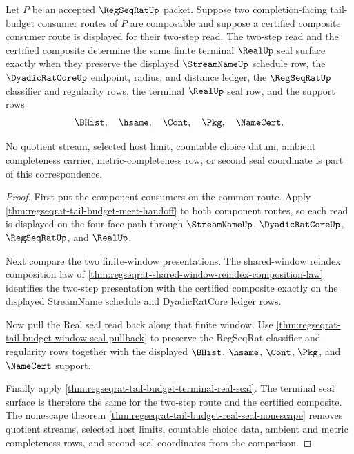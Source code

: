 \begin{theorem}
\label{thm:regseqrat-tail-budget-composition-correspondence}
Let $P$ be an accepted $\RegSeqRatUp$ packet. Suppose two completion-facing
tail-budget consumer routes of $P$ are composable and suppose a certified
composite consumer route is displayed for their two-step read. The two-step
read and the certified composite determine the same finite terminal $\RealUp$
seal surface exactly when they preserve the displayed $\StreamNameUp$ schedule
row, the $\DyadicRatCoreUp$ endpoint, radius, and distance ledger, the
$\RegSeqRatUp$ classifier and regularity rows, the terminal $\RealUp$ seal row,
and the support rows
$$
\BHist,\quad \hsame,\quad \Cont,\quad \Pkg,\quad \NameCert .
$$

No quotient stream, selected host limit, countable choice datum, ambient
completeness carrier, metric-completeness row, or second seal coordinate is part
of this correspondence.
\end{theorem}
\begin{proof}
First put the component consumers on the common route. Apply
\autoref{thm:regseqrat-tail-budget-meet-handoff} to both component routes, so
each read is displayed on the four-face path through $\StreamNameUp$,
$\DyadicRatCoreUp$, $\RegSeqRatUp$, and $\RealUp$.

Next compare the two finite-window presentations. The shared-window reindex
composition law of
\autoref{thm:regseqrat-shared-window-reindex-composition-law} identifies the
two-step presentation with the certified composite exactly on the displayed
StreamName schedule and DyadicRatCore ledger rows.

Now pull the Real seal read back along that finite window. Use
\autoref{thm:regseqrat-tail-budget-window-seal-pullback} to preserve the
RegSeqRat classifier and regularity rows together with the displayed $\BHist$,
$\hsame$, $\Cont$, $\Pkg$, and $\NameCert$ support.

Finally apply \autoref{thm:regseqrat-tail-budget-terminal-real-seal}. The
terminal seal surface is therefore the same for the two-step route and the
certified composite. The nonescape theorem
\autoref{thm:regseqrat-tail-budget-real-seal-nonescape} removes quotient
streams, selected host limits, countable choice data, ambient and metric
completeness rows, and second seal coordinates from the comparison.
\end{proof}

